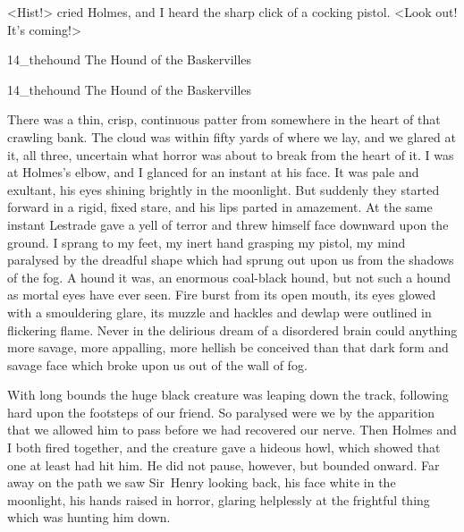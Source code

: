 <Hist!> cried Holmes, and I heard the sharp click of a cocking pistol. <Look out! It's coming!>


	
\begin{letter}
	\begin{bwbigpic}
			[1.0]  
		{14_thehound}
		{The Hound of the Baskervilles}
	\end{bwbigpic}
\end{letter}
\begin{a4}
	\begin{bwbigpic}
			[1.0]  
		{14_thehound}
		{The Hound of the Baskervilles}
	\end{bwbigpic}
\end{a4}
	
There was a thin, crisp, continuous patter from somewhere in the heart of that crawling bank. The cloud was within fifty yards of where we lay, and we glared at it, all three, uncertain what horror was about to break from the heart of it. I was at Holmes's elbow, and I glanced for an instant at his face. It was pale and exultant, his eyes shining brightly in the moonlight. But suddenly they started forward in a rigid, fixed stare, and his lips parted in amazement. At the same instant Lestrade gave a yell of terror and threw himself face downward upon the ground. I sprang to my feet, my inert hand grasping my pistol, my mind paralysed by the dreadful shape which had sprung out upon us from the shadows of the fog. A hound it was, an enormous coal-black hound, but not such a hound as mortal eyes have ever seen. Fire burst from its open mouth, its eyes glowed with a smouldering glare, its muzzle and hackles and dewlap were outlined in flickering flame. Never in the delirious dream of a disordered brain could anything more savage, more appalling, more hellish be conceived than that dark form and savage face which broke upon us out of the wall of fog.



With long bounds the huge black creature was leaping down the track, following hard upon the footsteps of our friend. So paralysed were we by the apparition that we allowed him to pass before we had recovered our nerve. Then Holmes and I both fired together, and the creature gave a hideous howl, which showed that one at least had hit him. He did not pause, however, but bounded onward. Far away on the path we saw Sir~Henry looking back, his face white in the moonlight, his hands raised in horror, glaring helplessly at the frightful thing which was hunting him down.

